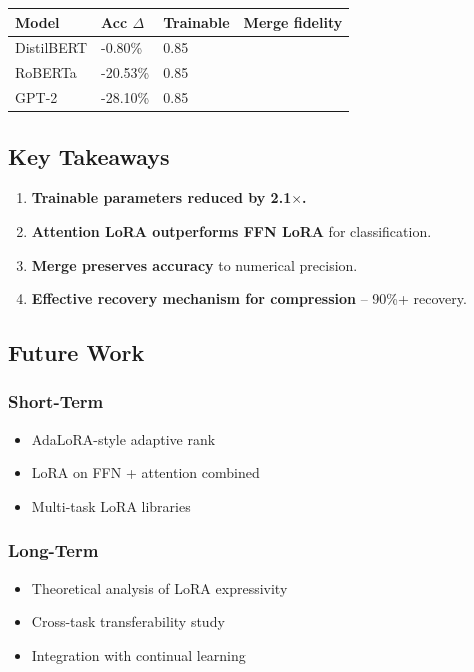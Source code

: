 \begin{table}[H]
\centering
\small
\begin{tabular}{llll}
\toprule
\textbf{Model} & \textbf{Acc $\Delta$} & \textbf{Trainable} & \textbf{Merge fidelity} \\
\midrule
DistilBERT & -0.80\% & 0.85 &  \\
RoBERTa & -20.53\% & 0.85 &  \\
GPT-2 & -28.10\% & 0.85 &  \\
\bottomrule
\end{tabular}
\end{table}

\subsection{Key Takeaways}

\begin{enumerate}
\item \textbf{Trainable parameters reduced by 2.1$\times$.}
\item \textbf{Attention LoRA outperforms FFN LoRA} for classification.
\item \textbf{Merge preserves accuracy} to numerical precision.
\item \textbf{Effective recovery mechanism for compression} -- 90\%+ recovery.

\end{enumerate}
\subsection{Future Work}

\subsubsection{Short-Term}
\begin{itemize}
\item AdaLoRA-style adaptive rank
\item LoRA on FFN + attention combined
\item Multi-task LoRA libraries

\end{itemize}
\subsubsection{Long-Term}
\begin{itemize}
\item Theoretical analysis of LoRA expressivity
\item Cross-task transferability study
\item Integration with continual learning

\end{itemize}
